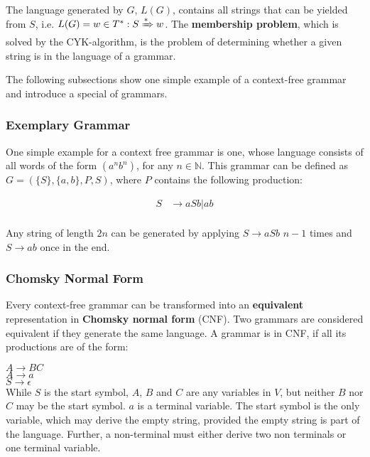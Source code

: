 The language generated by $G$, $L(G)$, contains all strings that can be yielded from $S$, i.e. $L(G)={w\in T^*: S\xRightarrow{*}w}$.
The \textbf{membership problem}, which is solved by the CYK-algorithm, is the problem of determining whether a given string is in the language of a grammar.

The following subsections show one simple example of a context-free grammar and introduce a special of grammars.

\subsubsection{Exemplary Grammar}
\label{subsec:exemplary_grammar}
One simple example for a context free grammar is one, whose language consists of all words of the form $(a^n b^n)$, for any $n\in \mathbb{N}$.
This grammar can be defined as $G = (\{S\}, \{a, b\}, P, S)$, where $P$ contains the following production: 

\begin{align*}
S&\rightarrow aSb | ab \\
\end{align*}

Any string of length $2n$ can be generated by applying $S\rightarrow aSb$ $n-1$ times and $S\rightarrow ab$ once in the end.


\subsubsection{Chomsky Normal Form}

Every context-free grammar can be transformed into an \textbf{equivalent} representation in \textbf{Chomsky normal form} (CNF).
Two grammars are considered equivalent if they generate the same language.
A grammar is in CNF, if all its productions are of the form:

\hspace*{0.5cm}$A\rightarrow BC$\\
\hspace*{1cm}$A\rightarrow a$\\
\hspace*{1cm}$S\rightarrow \epsilon$\\

While $S$ is the start symbol, $A$, $B$ and $C$ are any variables in $V$, but neither $B$ nor $C$ may be the start symbol.
$a$ is a terminal variable.
The start symbol is the only variable, which may derive the empty string, provided the empty string is part of the language.
Further, a non-terminal must either derive two non terminals or one terminal variable.

